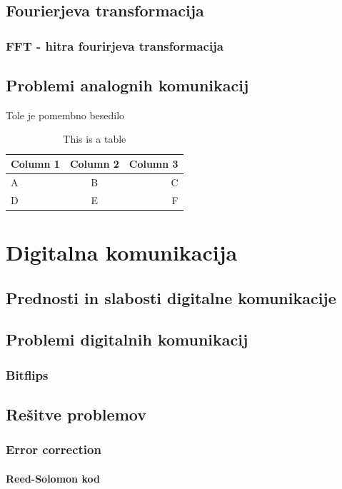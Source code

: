 \documentclass[12pt]{article}
\begin{document}
\newpage
    \subsection{Fourierjeva transformacija}
        \subsubsection{FFT - hitra fourirjeva transformacija}
    \subsection{Problemi analognih komunikacij}
        Tole je pomembno besedilo

\begin{table}[h]
    \centering
    \caption{This is a table}
    \begin{tabular}{lcr}
      \hline
      Column 1 & Column 2 & Column 3 \\
      \hline
      A & B & C \\
      D & E & F \\
      \hline
    \end{tabular}
    \label{tab:table}
\end{table}  


\newpage
\section{Digitalna komunikacija}
    \subsection{Prednosti in slabosti digitalne komunikacije}
    \subsection{Problemi digitalnih komunikacij}
        \subsubsection{Bitflips}
    \subsection{Rešitve problemov}
        \subsubsection{Error correction}
            \paragraph{Reed-Solomon kod}
\end{document}
